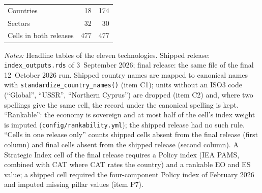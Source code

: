 \begin{table}[htbp]
\begin{threeparttable}
\begin{tabular}{@{}l r r@{}}
    Countries & 18 & 174 \\
    Sectors & 32 & 30 \\
    Cells in both releases & 477 & 477 \\
    \bottomrule
  \end{tabular}
  \begin{tablenotes}[flushleft]\footnotesize
    \item \emph{Notes:} Headline tables of the eleven technologies. Shipped release: \texttt{index\_outputs.rds} of 3~September 2026; final release: the same file of the final 12~October 2026 run. Shipped country names are mapped to canonical names with \texttt{standardize\_country\_names()} (item C1); units without an ISO3 code (``Global'', ``USSR'', ``Northern Cyprus'') are dropped (item C2) and, where two spellings give the same cell, the record under the canonical spelling is kept. ``Rankable'': the economy is sovereign and at most half of the cell's index weight is imputed (\texttt{config/rankability.yml}); the shipped release had no such rule. ``Cells in one release only'' counts shipped cells absent from the final release (first column) and final cells absent from the shipped release (second column). A Strategic Index cell of the final release requires a Policy index (IEA PAMS, combined with CAT where CAT rates the country) and a rankable EO and ES value; a shipped cell required the four-component Policy index of February 2026 and imputed missing pillar values (item P7).
  \end{tablenotes}
  \end{threeparttable}
\end{table}
